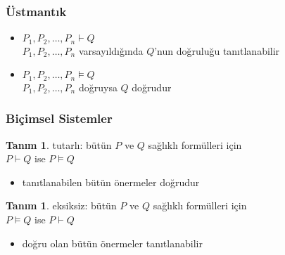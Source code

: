 \documentclass[dvipsnames]{beamer}
\theoremstyle{definition}
\newtheorem{tanim}[theorem]{Tanım}
\theoremstyle{example}
\theoremstyle{plain}
\begin{document}
\begin{frame}
  \frametitle{Üstmantık}

  \begin{itemize}
    \item $P_1,P_2,\dots,P_n \vdash Q$\\
      $P_1,P_2,\dots,P_n$ varsayıldığında $Q$'nun doğruluğu tanıtlanabilir

    \pause
    \medskip
    \item $P_1,P_2,\dots,P_n \vDash Q$\\
      $P_1,P_2,\dots,P_n$ doğruysa $Q$ doğrudur
  \end{itemize}
\end{frame}

\begin{frame}
  \frametitle{Biçimsel Sistemler}

  \begin{tanim}
    \alert{tutarlı}: bütün $P$ ve $Q$ sağlıklı formülleri için\\
      $P \vdash Q$ ise $P \vDash Q$
    \begin{itemize}
      \item tanıtlanabilen bütün önermeler doğrudur
    \end{itemize}
  \end{tanim}

  \pause
  \begin{tanim}
    \alert{eksiksiz}: bütün $P$ ve $Q$ sağlıklı formülleri için\\
      $P \vDash Q$ ise $P \vdash Q$
    \begin{itemize}
      \item doğru olan bütün önermeler tanıtlanabilir
    \end{itemize}
  \end{tanim}
\end{frame}
\end{document}
